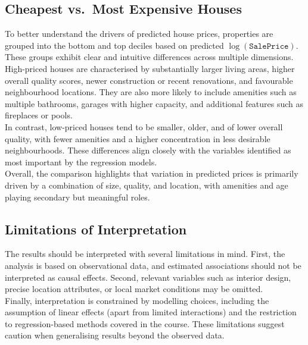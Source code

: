 \documentclass[12pt,oneside]{article} %
\begin{document}
\subsection{Cheapest vs.\ Most Expensive Houses}

To better understand the drivers of predicted house prices, properties are grouped into the bottom and top deciles based on predicted $\log(\texttt{SalePrice})$. These groups exhibit clear and intuitive differences across multiple dimensions.\\

\noindent
High-priced houses are characterised by substantially larger living areas, higher overall quality scores, newer construction or recent renovations, and favourable neighbourhood locations. They are also more likely to include amenities such as multiple bathrooms, garages with higher capacity, and additional features such as fireplaces or pools.\\

\noindent
In contrast, low-priced houses tend to be smaller, older, and of lower overall quality, with fewer amenities and a higher concentration in less desirable neighbourhoods. These differences align closely with the variables identified as most important by the regression models.\\

\noindent
Overall, the comparison highlights that variation in predicted prices is primarily driven by a combination of size, quality, and location, with amenities and age playing secondary but meaningful roles.


\subsection{Limitations of Interpretation}

The results should be interpreted with several limitations in mind. First, the analysis is based on observational data, and estimated associations should not be interpreted as causal effects. Second, relevant variables such as interior design, precise location attributes, or local market conditions may be omitted.\\

\noindent
Finally, interpretation is constrained by modelling choices, including the assumption of linear effects (apart from limited interactions) and the restriction to regression-based methods covered in the course. These limitations suggest caution when generalising results beyond the observed data.
\end{document}
